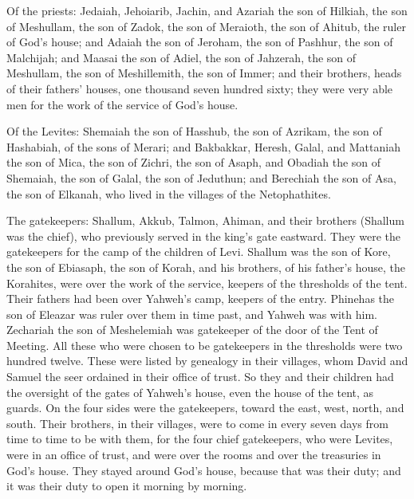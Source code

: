  Of the priests: Jedaiah, Jehoiarib, Jachin, 
and Azariah the son of Hilkiah, the son of Meshullam, the son of Zadok,
the son of Meraioth, the son of Ahitub, the ruler of God's house;
 and Adaiah the son of Jeroham, the son of Pashhur, the son
of Malchijah; and Maasai the son of Adiel, the son of Jahzerah, the son
of Meshullam, the son of Meshillemith, the son of Immer; 
and their brothers, heads of their fathers' houses, one thousand seven
hundred sixty; they were very able men for the work of the service of
God's house.

 Of the Levites: Shemaiah the son of Hasshub, the son of
Azrikam, the son of Hashabiah, of the sons of Merari;  and
Bakbakkar, Heresh, Galal, and Mattaniah the son of Mica, the son of
Zichri, the son of Asaph,  and Obadiah the son of Shemaiah,
the son of Galal, the son of Jeduthun; and Berechiah the son of Asa, the
son of Elkanah, who lived in the villages of the Netophathites.

 The gatekeepers: Shallum, Akkub, Talmon, Ahiman, and their
brothers (Shallum was the chief),  who previously served in
the king's gate eastward. They were the gatekeepers for the camp of the
children of Levi.  Shallum was the son of Kore, the son of
Ebiasaph, the son of Korah, and his brothers, of his father's house, the
Korahites, were over the work of the service, keepers of the thresholds
of the tent. Their fathers had been over Yahweh's camp, keepers of the
entry.  Phinehas the son of Eleazar was ruler over them in
time past, and Yahweh was with him.  Zechariah the son of
Meshelemiah was gatekeeper of the door of the Tent of Meeting.
 All these who were chosen to be gatekeepers in the
thresholds were two hundred twelve. These were listed by genealogy in
their villages, whom David and Samuel the seer ordained in their office
of trust.  So they and their children had the oversight of
the gates of Yahweh's house, even the house of the tent, as guards.
 On the four sides were the gatekeepers, toward the east,
west, north, and south.  Their brothers, in their villages,
were to come in every seven days from time to time to be with them,
 for the four chief gatekeepers, who were Levites, were in
an office of trust, and were over the rooms and over the treasuries in
God's house.  They stayed around God's house, because that
was their duty; and it was their duty to open it morning by morning.

